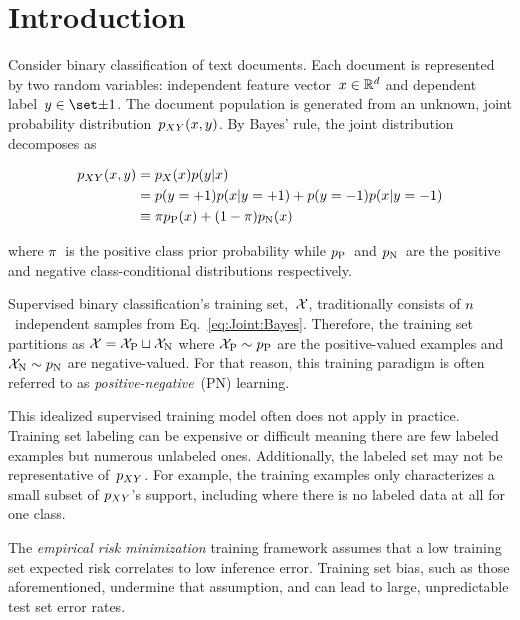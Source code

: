 \documentclass[]{subfiles}
\begin{document}
\section{Introduction}\label{sec:Introduction}

Consider binary classification of text documents.  Each document is represented by two random variables: independent feature vector~${x \in \mathbb{R}^{d}}$ and dependent label~${\y \in \domainY}$. The document population is generated from an unknown, joint probability distribution~${p_{XY}(x,y)}$.  By Bayes' rule, the joint distribution decomposes as

\begin{align}
    p_{XY}(x,y) &= p_{X}(x) p(y \vert x) \label{eq:TrainDist} \\
                  &= p(y = {+}1) p(x \vert y = {+}1) + p(y = {-}1) p(x \vert y = {-}1) \nonumber\\
                  &\equiv \pi p_{\textnormal{P}}(x) + (1 - \pi) p_{\textnormal{N}}(x) \label{eq:Joint:Bayes}
\end{align}

\noindent
where $\pi$~is the positive class prior probability while $p_{\textnormal{P}}$~and $p_{\textnormal{N}}$~are the positive and negative class-conditional distributions respectively.

Supervised binary classification's training set,~$\mathcal{X}$, traditionally consists of $n$~independent samples from Eq.~\eqref{eq:Joint:Bayes}.  Therefore, the training set partitions as ${\mathcal{X} = \mathcal{X}_{\textnormal{P}} \sqcup \mathcal{X}_{\textnormal{N}}}$ where ${\mathcal{X}_{\textnormal{P}} \sim p_{\textnormal{P}}}$ are the positive-valued examples and ${\mathcal{X}_{\textnormal{N}} \sim p_{\textnormal{N}}}$ are negative-valued.  For that reason, this training paradigm is often referred to as \textit{positive-negative}~(PN) learning.

This idealized supervised training model often does not apply in practice.  Training set labeling can be expensive or difficult meaning there are few labeled examples but numerous unlabeled ones.  Additionally, the labeled set may not be representative of~$p_{XY}$.  For example, the training examples only characterizes a small subset of $p_{XY}$'s support, including where there is no labeled data at all for one class.

The \textit{empirical risk minimization} training framework assumes that a low training set expected risk correlates to low inference error. Training set bias, such as those aforementioned, undermine that assumption, and can lead to large, unpredictable test set error rates.
\end{document}
